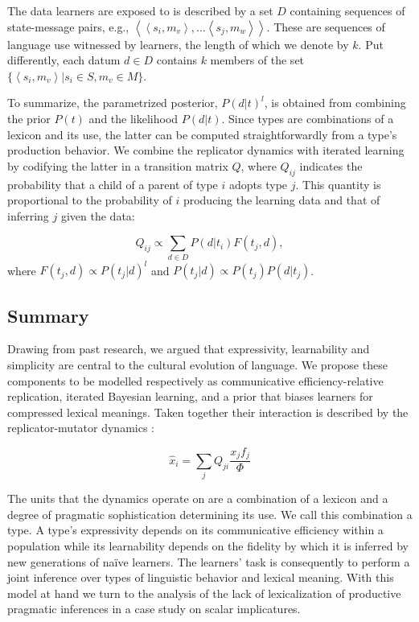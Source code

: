 \documentclass[a4paper]{article}
\newcommand{\tuple}[1]{\ensuremath{\left\langle #1 \right\rangle}}
\begin{document}
The data learners are exposed to is described by a set $D$ containing sequences of state-message pairs, e.g., $\tuple{\tuple{s_i,m_v},...\tuple{s_j,m_w}}$. These are sequences of language use witnessed by learners, the length of which we denote by $k$. Put differently, each datum $d \in D$ contains $k$ members of the set $\{\tuple{s_i,m_v} | s_i \in S, m_v \in M\}$.

To summarize, the parametrized posterior, $P(d|t)^l$, is obtained from combining the prior $P(t)$ and the likelihood $P(d|t)$. Since types are combinations of a lexicon and its use, the latter can be computed straightforwardly from a type's production behavior. We combine the replicator dynamics with iterated learning by codifying the latter in a transition matrix $Q$, where $Q_{ij}$ indicates the probability that a child of a parent of type $i$ adopts type $j$. This quantity is proportional to the probability of $i$ producing the learning data and that of inferring $j$ given the data: 

\[
 Q_{ij} \propto \sum_{d \in D} P(d|t_i) F(t_j,d),
\]
where $F(t_j,d) \propto P(t_j|d)^l$ and $P(t_j|d) \propto P(t_j) P(d|t_j)$.
 

\subsection{Summary}
Drawing from past research, we argued that expressivity, learnability and simplicity are central to the cultural evolution of language. We propose these components to be modelled respectively as communicative efficiency-relative replication, iterated Bayesian learning, and a prior that biases learners for compressed lexical meanings. Taken together their interaction is described by the replicator-mutator dynamics \citep{hofbauer+sigmund:2003}: 

\[ 
\hat{x}_i = \sum_j Q_{ji} \frac{x_jf_j}{\Phi}
\]

The units that the dynamics operate on are a combination of a lexicon and a degree of pragmatic sophistication determining its use. We call this combination a type. A type's expressivity depends on its communicative efficiency within a population while its learnability depends on the fidelity by which it is inferred by new generations of na\"ive learners. The learners' task is consequently to perform a joint inference over types of linguistic behavior and lexical meaning. With this model at hand we turn to the analysis of the lack of lexicalization of productive pragmatic inferences in a case study on scalar implicatures.
\end{document}
